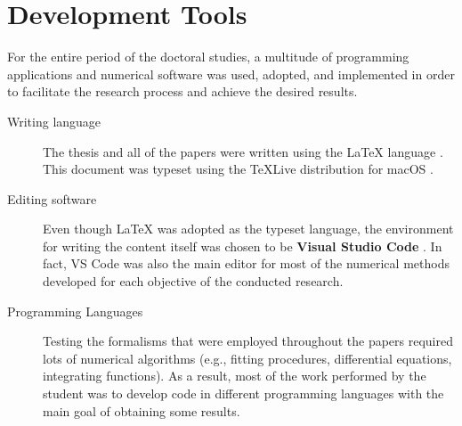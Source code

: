 \chapter{Development Tools}
\label{appendix:dev-tools}

For the entire period of the doctoral studies, a multitude of programming applications and numerical software was used, adopted, and implemented in order to facilitate the research process and achieve the desired results.

\begin{description}
    \item[Writing language] The thesis and all of the papers were written using the \LaTeX {} language \cite{lamport1986latex}. This document was typeset using the TeXLive distribution for macOS \cite{texlivemacos}.
    \item[Editing software] Even though \LaTeX {} was adopted as the typeset language, the environment for writing the content itself was chosen to be \textbf{Visual Studio Code} \cite{vscode}. In fact, VS Code was also the main editor for most of the numerical methods developed for each objective of the conducted research.
    \item[Programming Languages] Testing the formalisms that were employed throughout the papers required lots of numerical algorithms (e.g., fitting procedures, differential equations, integrating functions). As a result, most of the work performed by the student was to develop code in different programming languages with the main goal of obtaining some results.
\end{description}


